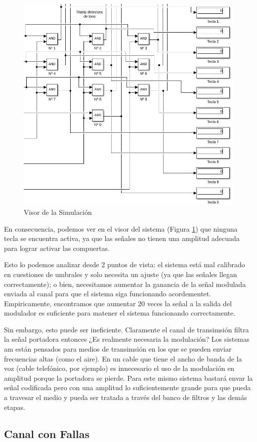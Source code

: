 \begin{figure}[!htb]
  \centering
  \includegraphics[width=400pt]{images/simulacion/reducido/sim.png}
  \caption{Visor de la Simulación}
  \label{fig:real_sim}
\end{figure}

\pagebreak

En consecuencia, podemos ver en el visor del sistema (Figura \ref{fig:real_sim}) que ninguna tecla se encuentra activa, ya que las señales no tienen una amplitud adecuada para lograr activar las compuertas.

Esto lo podemos analizar desde 2 puntos de vista: el sistema está mal calibrado en cuestiones de umbrales y solo necesita un ajuste (ya que las señales llegan correctamente); o bien, necesitamos aumentar la ganancia de la señal modulada enviada al canal para que el sistema siga funcionando acordementet. Empiricamente, encontramos que aumentar 20 veces la señal a la salida del modulador es suficiente para matener el sistema funcionando correctamente.

\pagebreak

Sin embargo, esto puede ser ineficiente. Claramente el canal de transimsión filtra la señal portadora entonces ¿Es realmente necesaria la modulación? Los sistemas \gls{am} están pensados para medios de transimsión en los que se pueden enviar frecuencias altas (como el aire). En un cable que tiene el ancho de banda de la voz (cable telefónico, por ejemplo) es innecesario el uso de la modulación en amplitud porque la portadora se pierde. Para este mismo sistema bastará envar la señal codificada pero con una amplitud lo suficientemente grande para que pueda a travesar el medio y pueda ser tratada a través del banco de filtros y las demás etapas.

\subsection{Canal con Fallas}